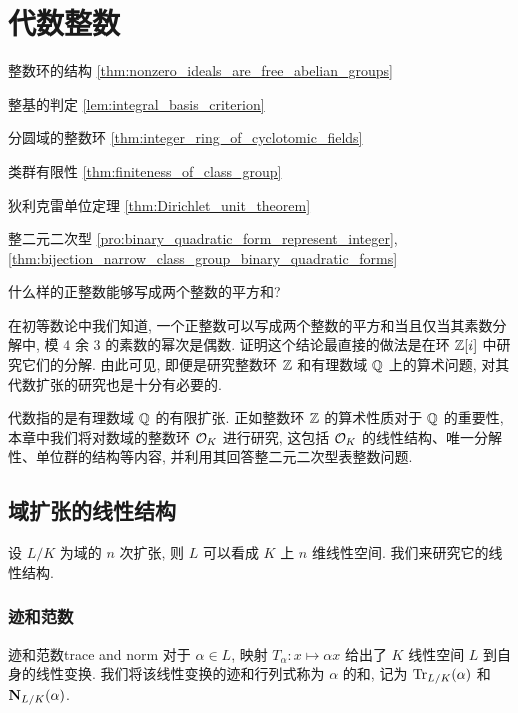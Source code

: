 \chapter{代数整数}
\begin{introduction}
\item 整数环的结构 \ref{thm:nonzero_ideals_are_free_abelian_groups}
\item 整基的判定 \ref{lem:integral_basis_criterion}
\item 分圆域的整数环 \ref{thm:integer_ring_of_cyclotomic_fields}
\item 类群有限性 \ref{thm:finiteness_of_class_group}
\item 狄利克雷单位定理 \ref{thm:Dirichlet_unit_theorem}
\item 整二元二次型 \ref{pro:binary_quadratic_form_represent_integer}, \ref{thm:bijection_narrow_class_group_binary_quadratic_forms}
\end{introduction}

\begin{question*}{}{}
什么样的正整数能够写成两个整数的平方和?
\end{question*}


在初等数论中我们知道, 一个正整数可以写成两个整数的平方和当且仅当其素数分解中, 模 $4$ 余 $3$ 的素数的幂次是偶数. 证明这个结论最直接的做法是在环 ${\mathbb{Z}}[i]$ 中研究它们的分解. 由此可见, 即便是研究整数环 ${\mathbb{Z}}$ 和有理数域 ${\mathbb{Q}}$ 上的算术问题, 对其代数扩张的研究也是十分有必要的.

代数指的是有理数域 ${\mathbb{Q}}$ 的有限扩张. 正如整数环 ${\mathbb{Z}}$ 的算术性质对于 ${\mathbb{Q}}$ 的重要性, 本章中我们将对数域的整数环 ${\mathcal{O}}_K$ 进行研究, 这包括 ${\mathcal{O}}_K$ 的线性结构、唯一分解性、单位群的结构等内容, 并利用其回答整二元二次型表整数问题.

\section{域扩张的线性结构}
设 $L/K$ 为域的 $n$ 次扩张, 则 $L$ 可以看成 $K$ 上 $n$ 维线性空间. 我们来研究它的线性结构.

\subsection{迹和范数}

\begin{definition}{迹和范数}{trace and norm}
对于 $\alpha\in L$, 映射 $T_\alpha:x\mapsto \alpha x$ 给出了 $K$ 线性空间 $L$ 到自身的线性变换. 我们将该线性变换的迹和行列式称为 $\alpha$ 的和, 记为 ${\mathrm{Tr}}_{L/K}(\alpha)$ 和 ${\mathbf{N}}_{L/K}(\alpha)$.
\end{definition}

